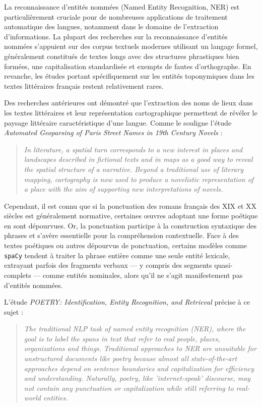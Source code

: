La reconnaissance d'entités nommées (Named Entity Recognition, NER) est particulièrement cruciale pour de nombreuses applications de traitement automatique des langues, notamment dans le domaine de l'extraction d'informations. La plupart des recherches sur la reconnaissance d'entités nommées s'appuient sur des corpus textuels modernes utilisant un langage formel, généralement constitués de textes longs avec des structures phrastiques bien formées, une capitalisation standardisée et exempts de fautes d'orthographe. En revanche, les études portant spécifiquement sur les entités toponymiques dans les textes littéraires français restent relativement rares.

Des recherches antérieures ont démontré que l'extraction des noms de lieux dans les textes littéraires et leur représentation cartographique permettent de révéler le paysage littéraire caractéristique d'une langue. Comme le souligne l'étude \textit{Automated Geoparsing of Paris Street Names in 19th Century Novels\cite{10.1145/3149858.3149859}} :
\begin{quote}
    \itshape
    In literature, a spatial turn corresponds to a new interest in places and landscapes described in fictional texts and in maps as a good way to reveal the spatial structure of a narrative. Beyond a traditional use of literary mapping, cartography is now used to produce a novelistic representation of a place with the aim of supporting new interpretations of novels.
\end{quote}

Cependant, il est connu que si la ponctuation des romans français des XIX et XX siècles est généralement normative, certaines œuvres adoptant une forme poétique en sont dépourvues. Or, la ponctuation participe à la construction syntaxique des phrases et s'avère essentielle pour la compréhension contextuelle. Face à des textes poétiques ou autres dépourvus de ponctuation, certains modèles comme \texttt{spaCy} tendent à traiter la phrase entière comme une seule entité lexicale, extrayant parfois des fragments verbaux --- y compris des segments quasi-complets --- comme entités nominales, alors qu'il ne s'agit manifestement pas d'entités nommées.

L'étude \textit{POETRY: Identification, Entity Recognition, and Retrieval \cite{foley2019poetry}} précise à ce sujet :
\begin{quote}
    \itshape
    The traditional NLP task of named entity recognition (NER), where the goal is to label the spans in text that refer to real people, places, organizations and things. Traditional approaches to NER are unsuitable for unstructured documents like poetry because almost all state-of-the-art approaches depend on sentence boundaries and capitalization for efficiency and understanding. Naturally, poetry, like 'internet-speak' discourse, may not contain any punctuation or capitalization while still referring to real-world entities.
\end{quote}

